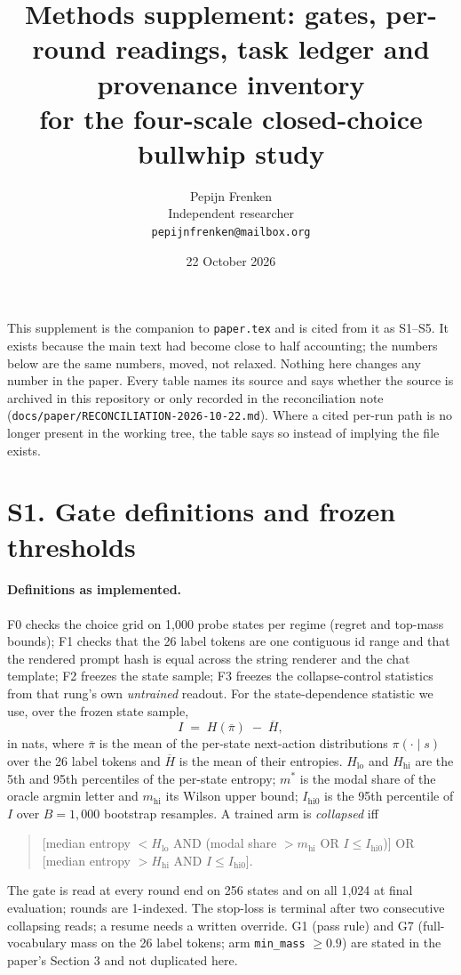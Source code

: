 \documentclass[11pt,a4paper]{article}
\title{Methods supplement: gates, per-round readings, task ledger and provenance inventory\\for the four-scale closed-choice bullwhip study}
\author{Pepijn Frenken\\Independent researcher\\\texttt{pepijnfrenken@mailbox.org}}
\date{22 October 2026}
\begin{document}
\maketitle

\noindent This supplement is the companion to \texttt{paper.tex} and is cited from it as S1--S5.
It exists because the main text had become close to half accounting; the numbers below are the
same numbers, moved, not relaxed. Nothing here changes any number in the paper. Every table names
its source and says whether the source is archived in this repository or only recorded in the
reconciliation note (\texttt{docs/paper/RECONCILIATION-2026-10-22.md}). Where a cited per-run path
is no longer present in the working tree, the table says so instead of implying the file exists.

\section{S1. Gate definitions and frozen thresholds}

\paragraph{Definitions as implemented.} F0 checks the choice grid on 1{,}000 probe states per
regime (regret and top-mass bounds); F1 checks that the 26 label tokens are one contiguous id range
and that the rendered prompt hash is equal across the string renderer and the chat template; F2
freezes the state sample; F3 freezes the collapse-control statistics from that rung's own
\emph{untrained} readout. For the state-dependence statistic we use, over the frozen state sample,
\begin{equation}
  I \;=\; H\!\left(\overline{\pi}\right) \;-\; \overline{H},
\end{equation}
in nats, where $\overline{\pi}$ is the mean of the per-state next-action distributions
$\pi(\cdot\mid s)$ over the 26 label tokens and $\overline{H}$ is the mean of their entropies.
$H_{\mathrm{lo}}$ and $H_{\mathrm{hi}}$ are the 5th and 95th percentiles of the per-state entropy;
$m^{*}$ is the modal share of the oracle argmin letter and $m_{\mathrm{hi}}$ its Wilson upper
bound; $I_{\mathrm{hi0}}$ is the 95th percentile of $I$ over $B{=}1{,}000$ bootstrap resamples.
A trained arm is \emph{collapsed} iff
\begin{quote}
[median entropy $< H_{\mathrm{lo}}$ AND (modal share $> m_{\mathrm{hi}}$ OR
$I \leq I_{\mathrm{hi0}}$)] OR
[median entropy $> H_{\mathrm{hi}}$ AND $I \leq I_{\mathrm{hi0}}$].
\end{quote}
The gate is read at every round end on 256 states and on all 1{,}024 at final evaluation; rounds
are 1-indexed. The stop-loss is terminal after two consecutive collapsing reads; a resume needs a
written override. G1 (pass rule) and G7 (full-vocabulary mass on the 26 label tokens; arm
\texttt{min\_mass} $\geq 0.9$) are stated in the paper's Section 3 and not duplicated here.
\end{document}
